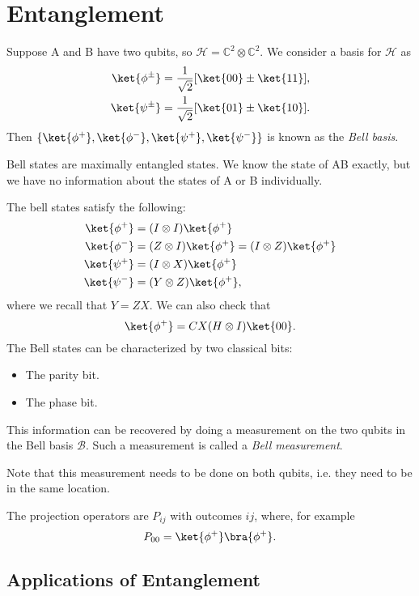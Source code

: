 \documentclass[12pt]{article}
\begin{document}
\newpage

\section{Entanglement}
\label{sec:ent}

Suppose A and B have two qubits, so $\mathcal{H} = \mathbb{C}^2 \otimes \mathbb{C}^2$. We consider a basis for $\mathcal{H}$ as
\begin{align*}
	\ket{\phi^{\pm}} &= \frac{1}{\sqrt 2}[\ket{00} \pm \ket{11}],\\
	\ket{\psi^{\pm}} &= \frac{1}{\sqrt 2}[\ket{01} \pm \ket{10}].
\end{align*}
Then $\{\ket{\phi^+}, \ket{\phi^-}, \ket{\psi^+}, \ket{\psi^{-}}\}$ is known as the \emph{Bell basis}.

Bell states are maximally entangled states. We know the state of AB exactly, but we have no information about the states of A or B individually.


The bell states satisfy the following:
\begin{align*}
	\ket{\phi^+} &= (I \otimes I) \ket{\phi^+} \\
	\ket{\phi^{-}} &= (Z \otimes I) \ket{\phi^+} = (I \otimes Z) \ket{\phi^+} \\
	\ket{\psi^+} &= (I \otimes X) \ket{\phi^+} \\
	\ket{\psi^-} &= (Y \otimes Z) \ket{\phi^+},
\end{align*}
where we recall that $Y = ZX$. We can also check that
\[
	\ket{\phi^+} = CX(H \otimes I) \ket{00}.
\]
The Bell states can be characterized by two classical bits:
\begin{itemize}
	\item The parity bit.
	\item The phase bit.
\end{itemize}
This information can be recovered by doing a measurement on the two qubits in the Bell basis $\mathcal{B}$. Such a measurement is called a \emph{Bell measurement}.

Note that this measurement needs to be done on both qubits, i.e. they need to be in the same location.

The projection operators are $P_{ij}$ with outcomes $ij$, where, for example
\[
	P_{00} = \ket{\phi^+}\bra{\phi^+}.
\]

\subsection{Applications of Entanglement}
\label{sub:app_ent}
\end{document}

